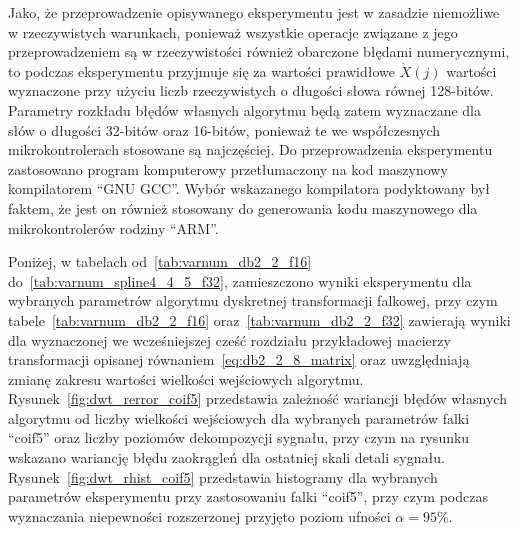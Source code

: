Jako, że przeprowadzenie opisywanego eksperymentu jest w zasadzie niemożliwe w rzeczywistych warunkach, ponieważ wszystkie operacje związane z jego przeprowadzeniem są w rzeczywistości również obarczone błędami numerycznymi, to podczas eksperymentu przyjmuje się za wartości prawidłowe $\dot{X}(j)$ wartości wyznaczone przy użyciu liczb rzeczywistych o długości słowa równej 128-bitów. Parametry rozkładu błędów własnych algorytmu będą zatem wyznaczane dla słów o długości 32-bitów oraz 16-bitów, ponieważ te we współczesnych mikrokontrolerach stosowane są najczęściej. Do przeprowadzenia eksperymentu zastosowano program komputerowy przetłumaczony na kod maszynowy kompilatorem \enquote{GNU GCC}. Wybór wskazanego kompilatora podyktowany był faktem, że jest on również stosowany do generowania kodu maszynowego dla mikrokontrolerów rodziny \enquote{ARM}.

Poniżej, w tabelach od~\ref{tab:varnum_db2_2_f16} do~\ref{tab:varnum_spline4_4_5_f32}, zamieszczono wyniki eksperymentu dla wybranych parametrów algorytmu dyskretnej transformacji falkowej, przy czym tabele~\ref{tab:varnum_db2_2_f16} oraz~\ref{tab:varnum_db2_2_f32} zawierają wyniki dla wyznaczonej we wcześniejszej cześć rozdziału przykładowej macierzy transformacji opisanej równaniem~\eqref{eq:db2_2_8_matrix} oraz uwzględniają zmianę zakresu wartości wielkości wejściowych algorytmu. Rysunek~\ref{fig:dwt_rerror_coif5} przedstawia zależność wariancji błędów własnych algorytmu od liczby wielkości wejściowych dla wybranych parametrów falki \enquote{coif5} oraz liczby poziomów dekompozycji sygnału, przy czym na rysunku wskazano wariancję błędu zaokrągleń dla ostatniej skali detali sygnału. Rysunek~\ref{fig:dwt_rhist_coif5} przedstawia histogramy dla wybranych parametrów eksperymentu przy zastosowaniu falki \enquote{coif5}, przy czym podczas wyznaczania niepewności rozszerzonej przyjęto poziom ufności $\alpha = 95\%$.

